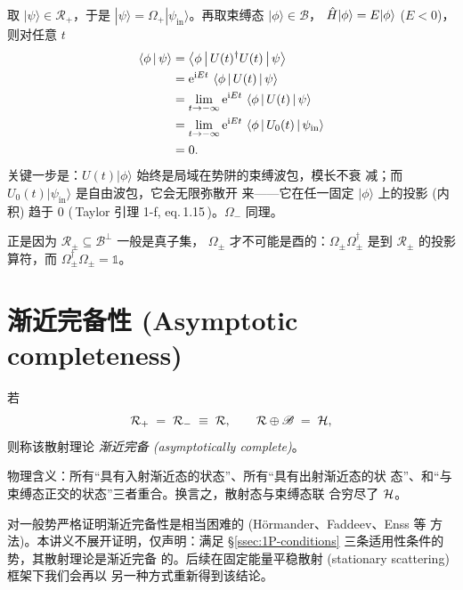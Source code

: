 \begin{proof*}
取 $|\psi\rangle\in\mathcal{R}_+$，于是 $|\psi\rangle=\Omega_+
|\psi_{\text{in}}\rangle$。再取束缚态 $|\phi\rangle\in\mathscr{B}$，
$\hat{H}|\phi\rangle=E|\phi\rangle$ ($E<0$)，则对任意 $t$
\begin{align*}
  \left\langle \phi \,\middle|\, \psi \right\rangle
  &=\left\langle \phi \,\middle|\, U(t)^{\dagger}U(t) \,\middle|\, \psi \right\rangle\\
  &= \mathrm{e}^{\mathrm{i} E t}\,\left\langle \phi \,\middle|\, U(t) \,\middle|\, \psi \right\rangle\\
  &= \lim_{t\to-\infty}\mathrm{e}^{\mathrm{i} E t}\,\left\langle \phi \,\middle|\, U(t) \,\middle|\, \psi \right\rangle\\
  &= \lim_{t\to-\infty}\mathrm{e}^{\mathrm{i} E t}\,\left\langle \phi \,\middle|\, U_0(t) \,\middle|\, \psi_{\text{in}} \right\rangle\\
  &= 0.
\end{align*}
关键一步是：$U(t)|\phi\rangle$ 始终是局域在势阱的束缚波包，模长不衰
减；而 $U_0(t)|\psi_{\text{in}}\rangle$ 是自由波包，它会无限弥散开
来——它在任一固定 $|\phi\rangle$ 上的投影 (内积) 趋于 $0$
(\,Taylor 引理 1\hbox{-}f, eq.\,1.15\,)。$\Omega_-$ 同理。
\end{proof*}

\begin{remark}
正是因为 $\mathcal{R}_\pm\subseteq \mathscr{B}^{\perp}$ 一般是真子集，
$\Omega_\pm$ 才不可能是酉的：$\Omega_\pm \Omega_\pm^{\dagger}$ 是到
$\mathcal{R}_\pm$ 的投影算符，而 $\Omega_\pm^{\dagger}\Omega_\pm =
\mathbb{1}$。
\end{remark}

\section{渐近完备性 (Asymptotic completeness)}
\label{sec:1P-completeness}

\begin{definition}
\label{def:1P-AC}
若
\begin{equation}
  \mathcal{R}_+ \;=\; \mathcal{R}_- \;\equiv\; \mathcal{R},\qquad
  \mathcal{R} \oplus \mathscr{B} \;=\; \mathcal{H},
  \label{eq:1P-AC}
\end{equation}
则称该散射理论 \emph{渐近完备 (asymptotically complete)}。
\end{definition}

物理含义：所有“具有入射渐近态的状态”、所有“具有出射渐近态的状
态”、和“与束缚态正交的状态”三者重合。换言之，散射态与束缚态联
合穷尽了 $\mathcal{H}$。

\begin{remark}
对一般势严格证明渐近完备性是相当困难的 (Hörmander、Faddeev、Enss 等
方法)。本讲义不展开证明，仅声明：满足
\S\ref{ssec:1P-conditions} 三条适用性条件的势，其散射理论是渐近完备
的。后续在固定能量平稳散射 (stationary scattering) 框架下我们会再以
另一种方式重新得到该结论。
\end{remark}

